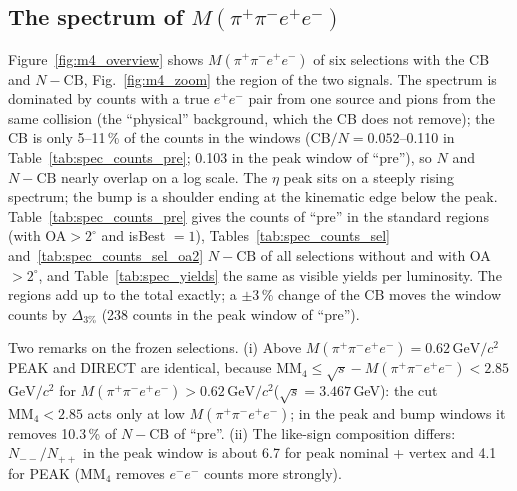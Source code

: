 \documentclass[11pt,a4paper]{article}
\newcommand{\ee}{\ensuremath{e^{+}e^{-}}\xspace}
\newcommand{\Mfour}{\ensuremath{M(\pi^{+}\pi^{-}e^{+}e^{-})}\xspace}
\newcommand{\GeVcc}{\ensuremath{\mathrm{GeV}/c^{2}}\xspace}
\newcommand{\MMfour}{\ensuremath{\mathrm{MM}_4}\xspace}
\begin{document}
\subsection{\texorpdfstring{The spectrum of $M(\pi^+\pi^-e^+e^-)$}{The M4 spectrum}}
\label{sec:m4}
Figure~\ref{fig:m4_overview} shows \Mfour of six selections with the CB and $N-\mathrm{CB}$, Fig.~\ref{fig:m4_zoom}
the region of the two signals. The spectrum is dominated by counts with a true \ee pair from one source and
pions from the same collision (the ``physical'' background, which the CB does not remove); the CB is only
5--11\,\% of the counts in the windows (CB$/N=0.052$--0.110 in Table~\ref{tab:spec_counts_pre}; 0.103 in the peak window of ``pre''), so $N$ and $N-\mathrm{CB}$ nearly overlap on a log
scale. The $\eta$ peak sits on a steeply rising spectrum; the bump is a shoulder ending at the kinematic edge
below the peak. Table~\ref{tab:spec_counts_pre} gives the counts of ``pre'' in the standard regions (with
OA$>2^\circ$ and isBest $=1$), Tables~\ref{tab:spec_counts_sel} and~\ref{tab:spec_counts_sel_oa2} $N-\mathrm{CB}$ of all
selections without and with OA$>2^\circ$, and Table~\ref{tab:spec_yields} the same as visible yields per
luminosity. The regions add up to the total exactly; a $\pm3$\,\% change of the CB moves the window counts by
$\Delta_{3\%}$ (238 counts in the peak window of ``pre'').

Two remarks on the frozen selections. (i) Above $\Mfour=0.62$\,\GeVcc PEAK and DIRECT are identical, because
$\MMfour\le\sqrt{s}-\Mfour<2.85$\,\GeVcc for $\Mfour>0.62$\,\GeVcc ($\sqrt{s}=3.467$\,GeV): the cut $\MMfour<2.85$ acts only at low \Mfour; in
the peak and bump windows it removes 10.3\,\% of $N-\mathrm{CB}$ of ``pre''. (ii) The like-sign composition differs:
$N_{--}/N_{++}$ in the peak window is about 6.7 for peak nominal + vertex and 4.1 for PEAK
(\MMfour removes $e^-e^-$ counts more strongly).
\end{document}

